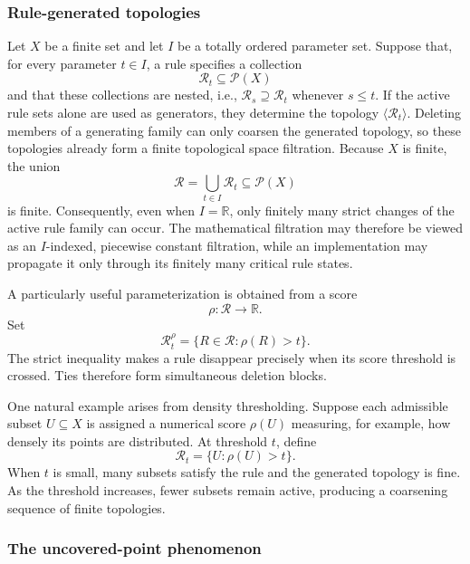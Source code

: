 \documentclass[a4paper,11pt]{article}
\theoremstyle{definition}
\theoremstyle{remark}
\begin{document}
\subsubsection*{Rule-generated topologies}

Let $X$ be a finite set and let $I$ be a totally ordered parameter set. Suppose that, for every parameter $t\in I$, a rule specifies a collection
$$
\mathcal R_t\subseteq\mathcal P(X)
$$
and that these collections are nested, i.e., $\mathcal R_s\supseteq\mathcal R_t$ whenever $s\leq t$. If the active rule sets alone are used as generators, they determine the topology $\langle\mathcal R_t\rangle$. Deleting members of a generating family can only coarsen the generated topology, so
these topologies already form a finite topological space filtration. Because $X$ is finite, the union
$$
\mathcal R=\bigcup_{t\in I}\mathcal R_t\subseteq \mathcal P(X)
$$
is finite. Consequently, even when $I=\mathbb{R}$, only finitely many strict changes of the active rule family can occur. The mathematical filtration may therefore be viewed as an $I$-indexed, piecewise constant filtration, while an implementation may propagate it only through its finitely many critical rule states.

A particularly useful parameterization is obtained from a score
$$
\rho\colon \mathcal R\longrightarrow\mathbb{R}.
$$
Set
$$
\mathcal R_t^{\rho} = \{R\in\mathcal R\colon \rho(R)>t\}.
$$
The strict inequality makes a rule disappear precisely when its score threshold is crossed. Ties therefore form simultaneous deletion blocks.

One natural example arises from density thresholding. Suppose each admissible subset $U\subseteq X$ is assigned a numerical score $\rho(U)$ measuring, for example, how densely its points are distributed. At threshold $t$, define
$$
\mathcal R_t = \{U\colon \rho(U)>t\}.
$$
When $t$ is small, many subsets satisfy the rule and the generated topology is fine. As the threshold increases, fewer subsets remain active, producing a coarsening sequence of finite topologies.


\subsubsection*{The uncovered-point phenomenon}
\end{document}
